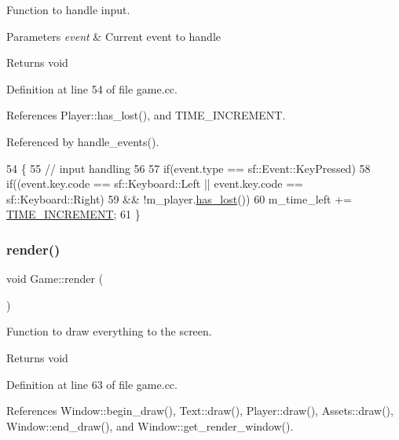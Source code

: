 Function to handle input. 


\begin{DoxyParams}{Parameters}
{\em event} & Current event to handle \\
\hline
\end{DoxyParams}
\begin{DoxyReturn}{Returns}
void 
\end{DoxyReturn}


Definition at line 54 of file game.\+cc.



References Player\+::has\+\_\+lost(), and T\+I\+M\+E\+\_\+\+I\+N\+C\+R\+E\+M\+E\+NT.



Referenced by handle\+\_\+events().


\begin{DoxyCode}
54                                      \{
55     \textcolor{comment}{// input handling}
56 
57     \textcolor{keywordflow}{if}(event.type == sf::Event::KeyPressed)
58         \textcolor{keywordflow}{if}((event.key.code == sf::Keyboard::Left || event.key.code == sf::Keyboard::Right)
59            && !m\_player.\hyperlink{class_player_a734ead9fd1aa89c2574310425da18dc7}{has\_lost}())
60             m\_time\_left += \hyperlink{game_8h_ad29ebde3c8bd7568e2e1e7d32bf7a3f3}{TIME\_INCREMENT};
61 \}
\end{DoxyCode}
\mbox{\label{class_game_a15ddd769261d923827a3cdf41499c843}} 
\subsubsection{\texorpdfstring{render()}{render()}}
{\footnotesize\ttfamily void Game\+::render (\begin{DoxyParamCaption}{ }\end{DoxyParamCaption})}



Function to draw everything to the screen. 

\begin{DoxyReturn}{Returns}
void 
\end{DoxyReturn}


Definition at line 63 of file game.\+cc.



References Window\+::begin\+\_\+draw(), Text\+::draw(), Player\+::draw(), Assets\+::draw(), Window\+::end\+\_\+draw(), and Window\+::get\+\_\+render\+\_\+window().



